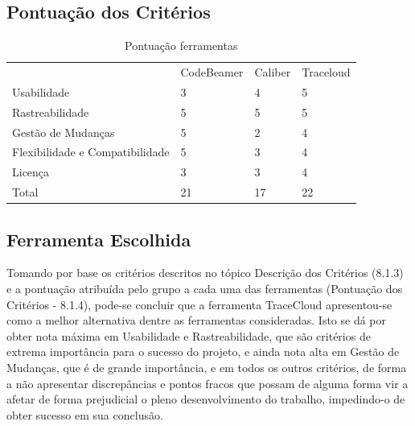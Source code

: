 \subsection{Pontuação dos Critérios}

\FloatBarrier
\begin{table}[\htp]
\centering
\caption{Pontuação ferramentas}
\label{my-label}
\begin{tabular}{llll}
 & CodeBeamer & Caliber & Traceloud \\
Usabilidade & 3 & 4 & 5 \\
Rastreabilidade & 5 & 5 & 5 \\
Gestão de Mudanças & 5 & 2 & 4 \\
Flexibilidade e Compatibilidade & 5 & 3 & 4 \\
Licença & 3 & 3 & 4 \\
Total & 21 & 17 & 22
\end{tabular}
\end{table}
\FloatBarrier

\subsection{Ferramenta Escolhida}

Tomando por base os critérios descritos no tópico Descrição dos Critérios (8.1.3) e a pontuação atribuída pelo grupo a cada uma das ferramentas (Pontuação dos Critérios - 8.1.4), pode-se concluir que a ferramenta TraceCloud apresentou-se como a melhor alternativa dentre as ferramentas consideradas. Isto se dá por obter nota máxima em Usabilidade e Rastreabilidade, que são critérios de extrema importância para o sucesso do projeto, e ainda nota alta em Gestão de Mudanças, que é de grande importância, e em todos os outros critérios, de forma a não apresentar discrepâncias e pontos fracos que possam de alguma forma vir a afetar de forma prejudicial o pleno desenvolvimento do trabalho, impedindo-o de obter sucesso em sua conclusão.
